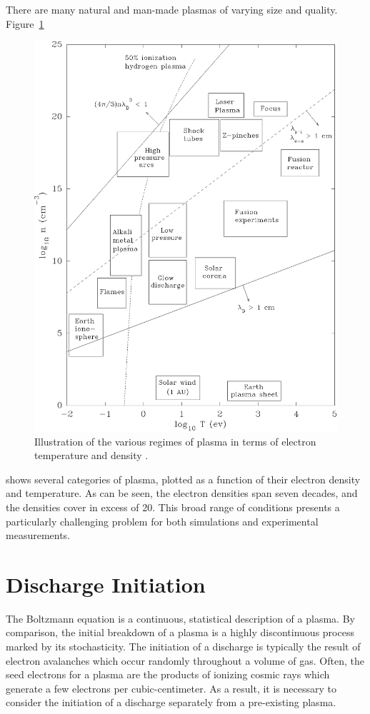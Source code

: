 There are many natural and man-made plasmas of varying size and quality.
Figure~\ref{fig:regimes}
\begin{figure}
  \centering
  \includegraphics{./chapters/theory/figures/regimes.eps}
  \caption{Illustration of the various regimes of plasma in terms of
electron temperature and density \cite{Huba2011}.}
  \label{fig:regimes}
\end{figure}
shows several categories of plasma, plotted as a function of their electron
density and temperature. As can be seen, the electron densities span seven
decades, and the densities cover in excess of 20. This broad range of conditions
presents a particularly challenging problem for both simulations and
experimental measurements.

\section{Discharge Initiation}
The Boltzmann equation is a continuous, statistical description of a plasma. By
comparison, the initial breakdown of a plasma is a highly discontinuous process
marked by its stochasticity. The initiation of a discharge is typically the
result of electron avalanches which occur randomly throughout a volume of gas.
Often, the seed electrons for a plasma are the products of ionizing cosmic rays
which generate a few electrons per cubic-centimeter. As a result, it is
necessary to consider the initiation of a discharge separately from a
pre-existing plasma.

